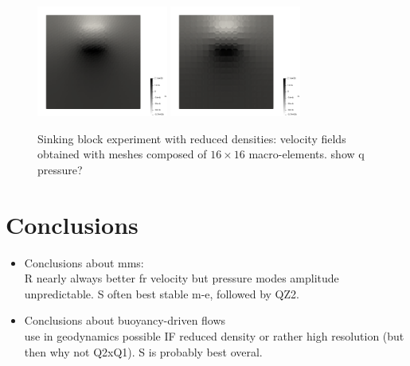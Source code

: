 \documentclass[a4paper,12pt]{article}
\begin{document}
\begin{figure}[t]
\includegraphics[width=4.3cm]{../results/exp08/fig16x16_reduced/press.0006.png}
\includegraphics[width=4.3cm]{../results/exp08/fig16x16_reduced/press.0007.png}
\caption{Sinking block experiment with reduced densities: velocity fields 
obtained with meshes composed of $16\times 16$ macro-elements.
{\color{red} show q pressure?}
 \label{fig:block4}}
\end{figure}









\newpage
\section{Conclusions}\label{sec5}

\begin{itemize}
\item Conclusions about mms:\\
R nearly always better fr velocity but pressure modes amplitude unpredictable.
S often best stable m-e, followed by QZ2.

\item Conclusions about buoyancy-driven flows\\
use in geodynamics possible IF reduced density or rather high resolution (but then why not Q2xQ1). 
S is probably best overal.

\end{itemize}
\end{document}
